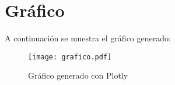 \documentclass{article}
\begin{document}
\section{Gráfico}

A continuación se muestra el gráfico generado:

\begin{figure}[h]
    \centering
    \texttt{[image: grafico.pdf]} %
    \caption{Gráfico generado con Plotly}
    \label{fig:grafico}
\end{figure}
\end{document}
